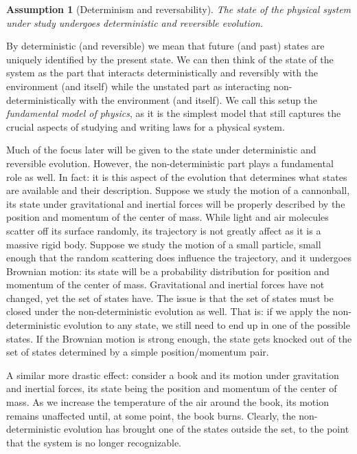 \documentclass[aps,pra,10pt,twocolumn,floatfix,nofootinbib]{revtex4-1}
\newtheorem{assump}{Assumption}
\theoremstyle{definition}
\begin{document}
\begin{assump}[Determinism and reversability]
The state of the physical system under study undergoes deterministic and reversible evolution.
\end{assump}

By deterministic (and reversible) we mean that future (and past) states are uniquely identified by the present state. We can then think of the state of the system as the part that interacts deterministically and reversibly with the environment (and itself) while the unstated part as interacting non-deterministically with the environment (and itself). We call this setup the \emph{fundamental model of physics}, as it is the simplest model that still captures the crucial aspects of studying and writing laws for a physical system.

Much of the focus later will be given to the state under deterministic and reversible evolution. However, the non-deterministic part plays a fundamental role as well. In fact: it is this aspect of the evolution that determines what states are available and their description. Suppose we study the motion of a cannonball, its state under gravitational and inertial forces will be properly described by the position and momentum of the center of mass. While light and air molecules scatter off its surface randomly, its trajectory is not greatly affect as it is a massive rigid body. Suppose we study the motion of a small particle, small enough that the random scattering does influence the trajectory, and it undergoes Brownian motion: its state will be a probability distribution for position and momentum of the center of mass. Gravitational and inertial forces have not changed, yet the set of states have. The issue is that the set of states must be closed under the non-deterministic evolution as well. That is: if we apply the non-deterministic evolution to any state, we still need to end up in one of the possible states. If the Brownian motion is strong enough, the state gets knocked out of the set of states determined by a simple position/momentum pair.

A similar more drastic effect: consider a book and its motion under gravitation and inertial forces, its state being the position and momentum of the center of mass. As we increase the temperature of the air around the book, its motion remains unaffected until, at some point, the book burns. Clearly, the non-deterministic evolution has brought one of the states outside the set, to the point that the system is no longer recognizable.
\end{document}
